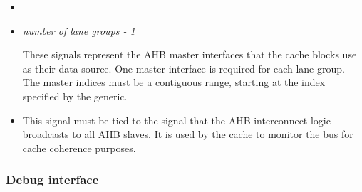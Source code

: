 \begin{itemize}

\item {}
\item {}\textit{number of lane groups - 1}

These signals represent the AHB master interfaces that the cache blocks use as
their data source. One master interface is required for each \rvex{} lane group.
The master indices must be a contiguous range, starting at the index specified
by the  generic.

\item {}

This signal must be tied to the signal that the AHB interconnect logic 
broadcasts to all AHB slaves. It is used by the cache to monitor the bus for 
cache coherence purposes.

\end{itemize}

\subsubsection{Debug interface}
\label{sec:rvsysgr-iface-debug}


